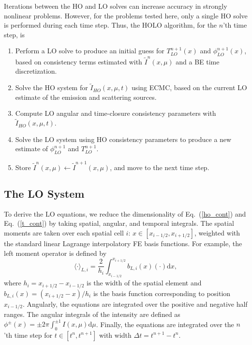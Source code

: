 \documentclass{anstrans}
\renewcommand{\eqref}[1]{(\ref{#1})}
\renewcommand{\d}{\mathrm{d}}
\newcommand{\mom}[1]{\langle #1 \rangle}
\newcommand{\xr}{{x_{i+1/2}}}
\begin{document}
Iterations between the HO and LO solves can increase accuracy in strongly nonlinear
problems. However, for the problems tested here, only a single HO solve is performed during each
time step.  Thus, the HOLO algorithm, for the $n$'th time step, is
\begin{enumerate}
    \item Perform a LO solve to produce an initial guess for $T_{LO}^{n+1}(x)$
        and $\phi_{LO}^{n+1}(x)$, based on consistency terms estimated with
        $\tilde{I}^{n}(x,\mu)$ and a BE time
    discretization.
\item Solve the HO system for $\tilde{I}_{HO}(x,\mu,t)$ using ECMC, based on the current
    LO estimate of the emission and scattering sources.%
\item Compute LO angular and time-closure consistency parameters with
    $\tilde{I}_{HO}(x,\mu,t)$.  
\item Solve the LO system using HO consistency parameters to produce a new
    estimate of $\phi^{n+1}_{LO}$ and $T^{n+1}_{LO}$.
\item Store $\tilde{I}^{n}(x,\mu)\leftarrow\tilde{I}^{n+1}(x,\mu)$, and move to the next time step.
\end{enumerate}

\subsection*{The LO System}
\label{sec:lo}

To derive the LO equations, we reduce the dimensionality of Eq.~\eqref{ho_cont} and
Eq.~\eqref{t_cont} by taking spatial, angular, and
temporal integrals.  The spatial moments are taken over each spatial cell $i$:
$x\in[x_{i-1/2},x_{i+1/2}]$, weighted with the standard linear Lagrange interpolatory FE basis functions.  For example, the left moment operator is defined by
\begin{equation}\label{x_mom}
    \mom{\cdot}_{L,i} = \frac{2}{h_i} \int_{x_{i-1/2}}^{\xr} b_{L,i}(x) (\cdot) \d x,
\end{equation}
where $h_i=x_{i+1/2}-x_{i-1/2}$ is the width of the spatial element and
$b_{L,i}(x)=(x_{i+1/2}-x)/h_i$ is the basis function corresponding to position
$x_{i-1/2}$. Angularly, the equations are integrated over the positive and negative half
ranges.  The angular integrals of the intensity are defined as $\phi^\pm(x) = \pm2\pi
\int_0^{\pm 1} I(x,\mu) \d \mu$.  Finally, the equations are integrated over the $n$'th
time step for $t\in[t^n,t^{n+1}]$ with width $\Delta t = t^{n+1}-t^{n}$.  
\end{document}
